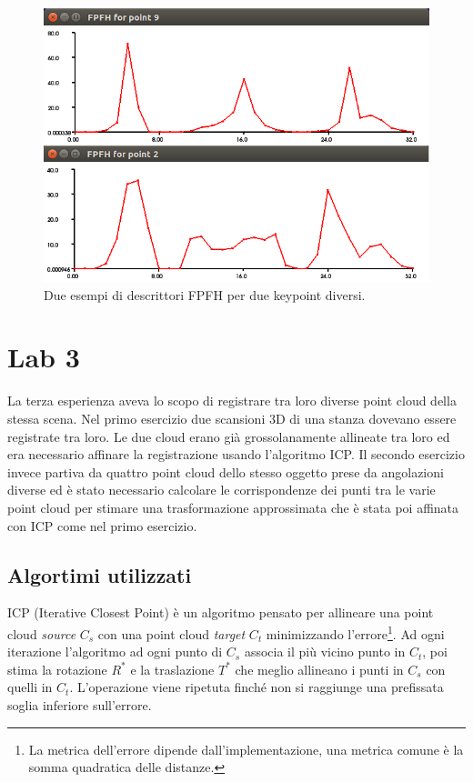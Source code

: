 \documentclass[a4paper]{article}
\begin{document}
	\begin{figure}
		\centering
		\includegraphics[width=1\textwidth]{images/lab2.png}
		\caption{\label{fig:lab2}Due esempi di descrittori FPFH per due keypoint diversi.}
	\end{figure}


\section{Lab 3} \label{sec:lab3}
La terza esperienza aveva lo scopo di registrare tra loro diverse point cloud della stessa scena. Nel primo esercizio due scansioni 3D di una stanza dovevano essere registrate tra loro. Le due cloud erano già grossolanamente allineate tra loro ed era necessario affinare la registrazione usando l'algoritmo ICP. Il secondo esercizio invece partiva da quattro point cloud dello stesso oggetto prese da angolazioni diverse ed è stato necessario calcolare le corrispondenze dei punti tra le varie point cloud per stimare una trasformazione approssimata che è stata poi affinata con ICP come nel primo esercizio.

	\subsection{Algortimi utilizzati}	\label{sec:lab3_alg}
	ICP (Iterative Closest Point) è un algoritmo pensato per allineare una point cloud \textit{source} $C_{s}$ con una point cloud \textit{target} $C_{t}$ minimizzando l'errore\footnote{La metrica dell'errore dipende dall'implementazione, una metrica comune è la somma quadratica delle distanze.}. Ad ogni iterazione l'algoritmo ad ogni punto di $C_{s}$ associa il più vicino punto in $C_{t}$, poi stima la rotazione $R^*$ e la traslazione $T^*$ che meglio allineano i punti in $C_{s}$ con quelli in  $C_{t}$. L'operazione viene ripetuta finché non si raggiunge una prefissata soglia inferiore sull'errore.
\end{document}
